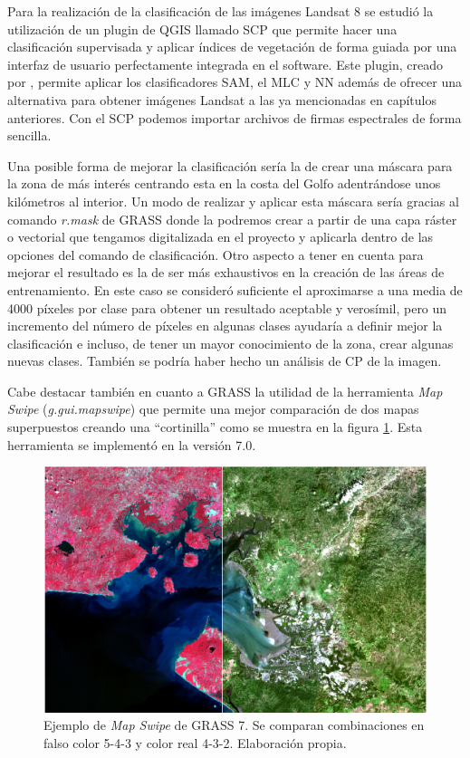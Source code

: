 Para la realización de la clasificación de las imágenes Landsat 8 se estudió la utilización de un plugin de QGIS llamado \ac{SCP} que permite hacer una clasificación supervisada y aplicar índices de vegetación de forma guiada por una interfaz de usuario perfectamente integrada en el software. Este plugin, creado por \cite{Congedo2015}, permite aplicar los clasificadores \ac{SAM}, el \ac{MLC} y \ac{NN} además de ofrecer una alternativa para obtener imágenes Landsat a las ya mencionadas en capítulos anteriores. Con el \ac{SCP} podemos importar archivos de firmas espectrales de forma sencilla.%

Una posible forma de mejorar la clasificación sería la de crear una máscara para la zona de más interés centrando esta en la costa del Golfo adentrándose unos kilómetros al interior. Un modo de realizar y aplicar esta máscara sería gracias al comando \textit{r.mask} de GRASS donde la podremos crear a partir de una capa ráster o vectorial que tengamos digitalizada en el proyecto y aplicarla dentro de las opciones del comando de clasificación. Otro aspecto a tener en cuenta para mejorar el resultado es la de ser más exhaustivos en la creación de las áreas de entrenamiento. En este caso se consideró suficiente el aproximarse a una media de 4000 píxeles por clase para obtener un resultado aceptable y verosímil, pero un incremento del número de píxeles en algunas clases ayudaría a definir mejor la clasificación e incluso, de tener un mayor conocimiento de la zona, crear algunas nuevas clases. También se podría haber hecho un análisis de \ac{CP} de la imagen.%

Cabe destacar también en cuanto a GRASS la utilidad de la herramienta \textit{Map Swipe} (\textit{g.gui.mapswipe}) que permite una mejor comparación de dos mapas superpuestos creando una ``cortinilla'' como se muestra en la figura \ref{fig:map_swipe}. Esta herramienta se implementó en la versión 7.0.

\begin{figure}
	\centering
	\includegraphics[width=0.9\linewidth]{./Imagenes/Map_swipe.eps}
	\caption[\textit{Map Swipe} de GRASS 7]{Ejemplo de \textit{Map Swipe} de GRASS 7. Se comparan combinaciones en falso color 5-4-3 y color real 4-3-2. Elaboración propia.}
	\label{fig:map_swipe}
\end{figure}